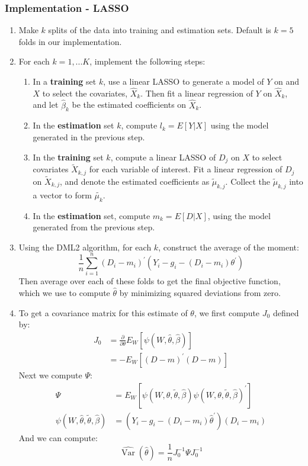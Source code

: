 \documentclass[11pt]{article}
\begin{document}
\subsubsection{Implementation - LASSO}
\begin{enumerate}
	\item Make $k$  splits of the data into training and estimation sets. Default is $k = 5$ folds in our implementation.
	\item For each $k = 1, ... K$, implement the following steps:
  \begin{enumerate}
    \item In a \textbf{training} set $k$, use a linear LASSO to generate a model of  $Y$ on and $X$ to select the covariates, $\hat{X}_k$. Then fit a linear regression of $Y$ on $\hat{X}_k$, and let $\hat{\beta}_k$ be the estimated coefficients on $\hat{X}_k$.
  	\item In the \textbf{estimation} set $k$, compute $l_k = E[Y|X]$ using the model generated in the previous step.
  	\item In the \textbf{training} set $k$, compute a linear LASSO of $D_j$ on $X$ to select covariates $\tilde{X}_{k,j}$ for each variable of interest. Fit a linear regression of $D_j$ on $\tilde{X}_{k,j}$, and denote the estimated coefficients as $\tilde{\mu}_{k,j}$. Collect the $\tilde{\mu}_{k,j}$ into a vector to form $\tilde{\mu_k}$.
  	\item In the \textbf{estimation} set, compute $m_k = E[D|X]$, using the model generated from the previous step.
  \end{enumerate}
	\item Using the DML2 algorithm, for each $k$, construct the average of the moment:
	$$\frac{1}{n} \sum_{i=1}^{n} (D_i - m_{i})^\prime\left({Y}_{i}- g_i -(D_{i} - m_i) \theta^{\prime}\right)$$
	Then average over each of these folds to get the final objective function, which we use to compute $\hat{\theta}$ by minimizing squared deviations from zero.
	\item To get a covariance matrix for this estimate of $\theta$, we first compute $J_0$ defined by:
	$$
	\begin{aligned}
	J_{0} &=\frac{\partial}{\partial \theta} E_{W}\left[ \psi(W, \hat{\theta}, \hat{\beta}) \right]\\
	&=-E_{W}\left[(D-m)^{\prime} (D-m)\right]
	\end{aligned}$$
	Next we compute $\Psi:$
	$$
	\begin{aligned}
	\Psi &=E_{W}\left[\psi(W, \theta, \tilde{\theta}, \hat{\beta}) \psi(W, \theta, \tilde{\theta}, \hat{\beta})^{\prime}\right] \\
	\psi(W, \hat{\theta}, \tilde{\theta}, \hat{\beta}) &= (Y_{i}- g_i - (D_{i} - m_i)\hat{\theta}^{\prime}) (D_i - m_i)
	\end{aligned}
	$$
	And we can compute:
	$$\hat{\operatorname{Var}}(\hat{\theta})=\frac{1}{n} J_{0}^{-1} \Psi J_{0}^{-1}$$
\end{enumerate}
\end{document}
